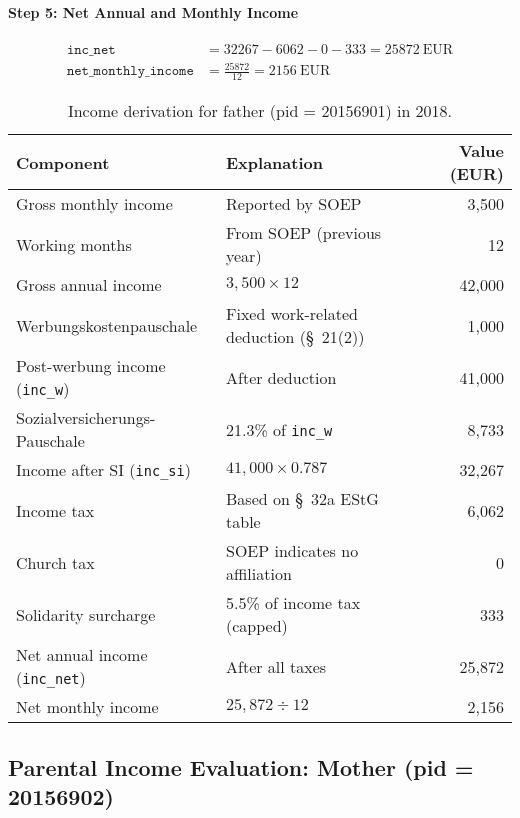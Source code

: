 \paragraph{Step 5: Net Annual and Monthly Income}

\begin{align*}
    \texttt{inc\_net} &= 32267 - 6062 - 0 - 333 = 25872~\text{EUR} \\
    \texttt{net\_monthly\_income} &= \frac{25872}{12} = 2156~\text{EUR}
\end{align*}

\begin{table}[H]
\footnotesize
\centering
\begin{tabularx}{\textwidth}{lXr}
\toprule
\textbf{Component} & \textbf{Explanation} & \textbf{Value (EUR)} \\
\midrule
Gross monthly income & Reported by SOEP & 3,500 \\
Working months & From SOEP (previous year) & 12 \\
Gross annual income & $3{,}500 \times 12$ & 42,000 \\
Werbungskostenpauschale & Fixed work-related deduction (§~21(2)) & 1,000 \\
Post-werbung income (\texttt{inc\_w}) & After deduction & 41,000 \\
Sozialversicherungs-Pauschale & 21.3\% of \texttt{inc\_w} & 8,733 \\
Income after SI (\texttt{inc\_si}) & $41{,}000 \times 0.787$ & 32,267 \\
Income tax & Based on §~32a EStG table & 6,062 \\
Church tax & SOEP indicates no affiliation & 0 \\
Solidarity surcharge & 5.5\% of income tax (capped) & 333 \\
Net annual income (\texttt{inc\_net}) & After all taxes & 25,872 \\
Net monthly income & $25{,}872 \div 12$ & 2,156 \\
\bottomrule
\end{tabularx}
\caption{Income derivation for father (pid = 20156901) in 2018.}
\label{table:bafoeg_parent_father}
\end{table}


\subsection{Parental Income Evaluation: Mother (pid = 20156902)}

